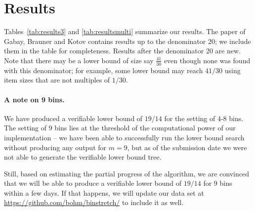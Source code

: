 \section{Results}\label{sec:results}

Tables~\ref{tab:results3} and \ref{tab:resultsmulti} summarize our
results. The paper of Gabay, Brauner and Kotov \cite{gabay2013lbv2}
contains results up to the denominator 20; we include them in the
table for completeness. Results after the denominator 20 are new. Note
that there may be a lower bound of size say $\frac{41}{30}$ even
though none was found with this denominator; for example, some lower
bound may reach $41/30$ using item sizes that are not multiples of
$1/30$.

\paragraph{A note on 9 bins.} We have produced a verifiable lower
bound of $19/14$ for the setting of 4-8 bins. The setting of $9$
bins lies at the threshold of the computational power of our
implementation -- we have been able to successfully run the lower
bound search without producing any output for $m=9$, but as of the
submission date we were not able to generate the verifiable lower
bound tree.

Still, based on estimating the partial progress of the algorithm, we
are convinced that we will be able to produce a verifiable lower bound
of $19/14$ for $9$ bins within a few days. If that happens, we will
update our data set at \url{https://github.com/bohm/binstretch/} to
include it as well.

